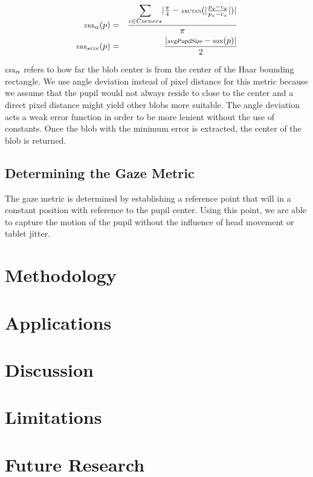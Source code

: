 \documentclass[annual]{acmsiggraph}
\newcommand{\Function}[1]{\ensuremath{{\small \textsc{#1}}}}
\newcommand{\Var}[1]{\ensuremath{{\small{\textsl{#1}}}}}
\begin{document}
\begin{eqnarray}
\Function{err}_{\alpha}(p) &=& \frac{
    \mathlarger{\sum}_{c \in Corners}{
        \vert 
            \frac{\pi}{4} - \Function{arctan}(
                \vert \frac{p_y - c_y}{p_x - c_x} \vert
            ) 
        \vert
    }
}{\pi} \\
\Function{err}_{size}(p) &=& \frac{
     \vert
        \Var{avgPupilSize} - \Function{size}(p)
    \vert
}{2}
\end{eqnarray}

$\Function{err}_{\alpha}$ refers to how far the blob center is from the
center of the Haar bounding rectangle. We use angle deviation instead
of pixel distance for this metric because we assume that the pupil would
not always reside to close to the center and a direct pixel distance
might yield other blobs more suitable. The angle deviation acts a weak
error function in order to be more lenient without the use of constants.
Once the blob with the minimum error is extracted, the center of the blob
is returned.

\subsection{Determining the Gaze Metric}

The gaze metric is determined by establishing a reference point that will
in a constant position with reference to the pupil center. Using this point,
we are able to capture the motion of the pupil without the influence of
head movement or tablet jitter.

\section{Methodology}

\section{Applications}

\section{Discussion}

\section{Limitations}

\section{Future Research}



\end{document}
